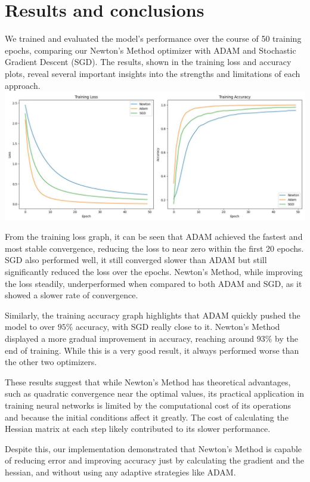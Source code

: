 \documentclass[10pt]{article}
\begin{document}
\section{Results and conclusions}
We trained and evaluated the model's performance over the course of 50 training epochs, comparing our Newton's Method optimizer with ADAM and Stochastic Gradient Descent (SGD). The results, shown in the training loss and accuracy plots, reveal several important insights into the strengths and limitations of each approach.\\
\includegraphics[max width=\textwidth, center]{2025_04_08_c5129b05008e68f8b3cdg-2}

From the training loss graph, it can be seen that ADAM achieved the fastest and most stable convergence, reducing the loss to near zero within the first 20 epochs. SGD also performed well, it still converged slower than ADAM but still significantly reduced the loss over the epochs. Newton's Method, while improving the loss steadily, underperformed when compared to both ADAM and SGD, as it showed a slower rate of convergence.

Similarly, the training accuracy graph highlights that ADAM quickly pushed the model to over $95 \%$ accuracy, with SGD really close to it. Newton's Method displayed a more gradual improvement in accuracy, reaching around $93 \%$ by the end of training. While this is a very good result, it always performed worse than the other two optimizers.

These results suggest that while Newton's Method has theoretical advantages, such as quadratic convergence near the optimal values, its practical application in training neural networks is limited by the computational cost of its operations and because the initial conditions affect it greatly. The cost of calculating the Hessian matrix at each step likely contributed to its slower performance.

Despite this, our implementation demonstrated that Newton's Method is capable of reducing error and improving accuracy just by calculating the gradient and the hessian, and without using any adaptive strategies like ADAM.
\end{document}
